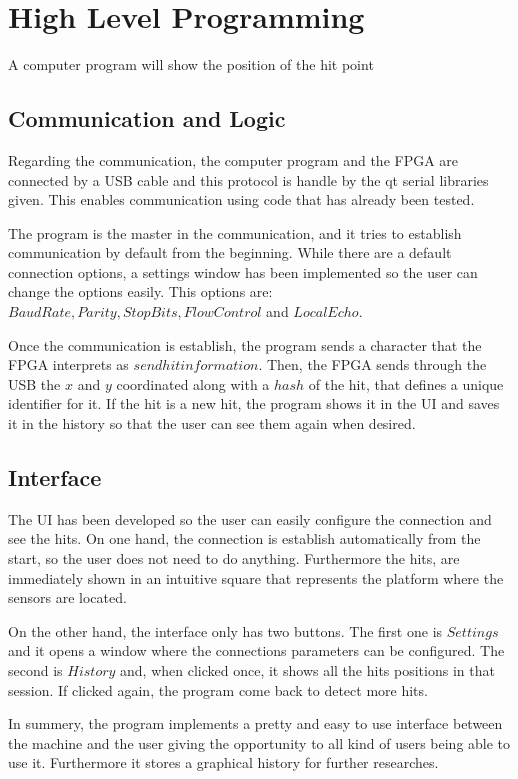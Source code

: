 \chapter{High Level Programming}
\label{chap:high_level_programming}
	A computer program will show the position of the hit point
	\section{Communication and Logic}
	\label{sec:communication_and_logic}
		Regarding the communication, the computer program and the FPGA are connected by a USB cable and this protocol is handle by the qt serial libraries given. 
		This enables communication using code that has already been tested.

		The program is the master in the communication, and it tries to establish communication by default from the beginning.
		While there are a default connection options, a settings window has been implemented so the user can change the options easily. 
		This options are: $Baud Rate, Parity, Stop Bits, Flow Control$ and $Local Echo$.

		Once the communication is establish, the program sends a character that the FPGA interprets as $send hit information$. 
		Then, the FPGA sends through the USB the $x$ and $y$ coordinated along with a $hash$ of the hit, that defines a unique identifier for it. 
		If the hit is a new hit, the program shows it in the UI and saves it in the history so that the user can see them again when desired.
	\section{Interface}
	\label{sec:program_interface}
		The UI has been developed so the user can easily configure the connection and see the hits. 
		On one hand, the connection is establish automatically from the start, so the user does not need to do anything. Furthermore the hits, are immediately shown in an intuitive square that represents the platform where the sensors are located.

		On the other hand, the interface only has two buttons. The first one is $Settings$ and it opens a window where the connections parameters can be configured. The second is $History$ and, when clicked once, it shows all the hits positions in that session. If clicked again, the program come back to detect more hits.

		In summery, the program implements a pretty and easy to use interface between the machine and the user giving the opportunity to all kind of users being able to use it. Furthermore it stores a graphical history for further researches.

